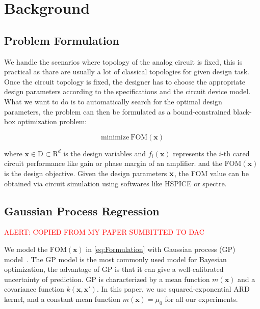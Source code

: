 \section{Background}


\subsection{Problem Formulation}


We handle the scenarios where topology of the analog circuit is fixed, this is
practical as thare are usually a lot of classical topologies for given design
task. Once the circuit topology is fixed, the designer has to choose the
appropriate design parameters according to the specifications and the circuit
device model. What we want to do is to automatically search for the optimal
design parameters, the problem can then be formulated as a bound-constrained
black-box optimization problem:

\begin{equation}
    \label{eq:Formulation}
    \text{minimize}~\mathrm{FOM}(\bm{x})
\end{equation}

where $\bm{x} \in \textrm{D} \subset \textrm{R}^d$ is the design variables
and $f_i(\bm{x})$ represents the $i$-th cared circuit performance like gain
or phase margin of an amplifier. and the $\mathrm{FOM}(\bm{x})$ is the
design objective. Given the design parameters $\bf{x}$, the FOM value can be
obtained via circuit simulation using softwares like HSPICE or spectre.


\subsection{Gaussian Process Regression}

\textcolor{red}{ALERT: COPIED FROM MY PAPER SUMBITTED TO DAC}

We model the $\mathrm{FOM}(\bm{x})$ in \eqref{eq:Formulation} with Gaussian
process (GP) model~\cite{GPML}. The GP model is the most commonly used model
for Bayesian optimization, the advantage of GP is that it can give a
well-calibrated uncertainty of prediction. GP is characterized by a mean
function $m(\bm{x})$ and a covariance function $k(\bm{x}, \bm{x'})$. In this
paper, we use squared-exponential ARD kernel, and a constant mean function
$m(\bm{x}) = \mu_0$ for all our experiments.

